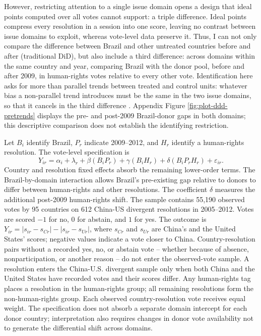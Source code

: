 \documentclass[referee,pdflatex,sn-basic]{sn-jnl}
\theoremstyle{thmstylethree}
\begin{document}
However, restricting attention to a single issue domain opens a design that ideal points computed over all votes cannot support: a triple difference. Ideal points compress every resolution in a session into one score, leaving no contrast between issue domains to exploit, whereas vote-level data preserve it. Thus, I can not only compare the difference between Brazil and other untreated countries before and after (traditional DiD), but also include a third difference: across domains within the same country and year, comparing Brazil with the donor pool, before and after 2009, in human-rights votes relative to every other vote. Identification here asks for more than parallel trends between treated and control units: whatever bias a non-parallel trend introduces must be the same in the two issue domains, so that it cancels in the third difference \citep{olden_moen2022}. Appendix Figure \ref{fig:plot-ddd-pretrends} displays the pre- and post-2009 Brazil-donor gaps in both domains; this descriptive comparison does not establish the identifying restriction.

Let \(B_i\) identify Brazil, \(P_r\) indicate 2009--2012, and \(H_r\) identify a human-rights resolution. The vote-level specification is
\[
Y_{ir}=\alpha_i+\lambda_r+\beta(B_iP_r)+\gamma(B_iH_r)+\delta(B_iP_rH_r)+\varepsilon_{ir}.
\]
Country and resolution fixed effects absorb the remaining lower-order terms. The Brazil-by-domain interaction allows Brazil's pre-existing gap relative to donors to differ between human-rights and other resolutions. The coefficient \(\delta\) measures the additional post-2009 human-rights shift. The sample contains 55,190 observed votes by 95 countries on 612 China-US divergent resolutions in 2005--2012. Votes are scored \(-1\) for no, \(0\) for abstain, and \(1\) for yes. The outcome is \(Y_{ir}=|s_{ir}-s_{Cr}|-|s_{ir}-s_{Ur}|\), where \(s_{Cr}\) and \(s_{Ur}\) are China's and the United States' scores; negative values indicate a vote closer to China. Country-resolution pairs without a recorded yes, no, or abstain vote -- whether because of absence, nonparticipation, or another reason -- do not enter the observed-vote sample. A resolution enters the China-U.S. divergent sample only when both China and the United States have recorded votes and their scores differ. Any human-rights tag places a resolution in the human-rights group; all remaining resolutions form the non-human-rights group. Each observed country-resolution vote receives equal weight. The specification does not absorb a separate domain intercept for each donor country; interpretation also requires changes in donor vote availability not to generate the differential shift across domains.
\end{document}
